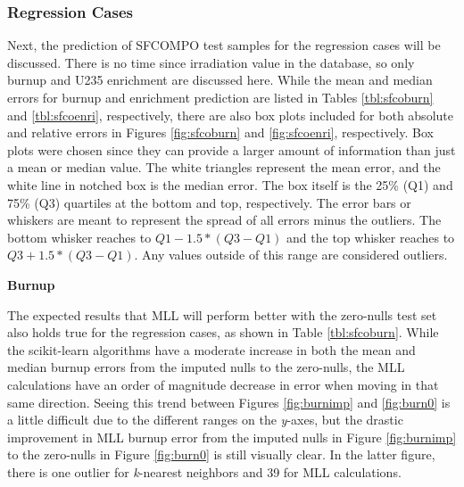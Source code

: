 \subsubsection{Regression Cases}
\label{sec:sfcoreg}

Next, the prediction of \gls{SFCOMPO} test samples for the regression cases
will be discussed. There is no time since irradiation value in the database, so
only burnup and \gls{U235} enrichment are discussed here.  While the mean and
median errors for burnup and enrichment prediction are listed in Tables
\ref{tbl:sfcoburn} and \ref{tbl:sfcoenri}, respectively, there are also box
plots included for both absolute and relative errors in Figures
\ref{fig:sfcoburn} and \ref{fig:sfcoenri}, respectively.  Box plots were chosen
since they can provide a larger amount of information than just a mean or
median value.  The white triangles represent the mean error, and the white line
in notched box is the median error. The box itself is the 25\% (Q1) and 75\%
(Q3) quartiles at the bottom and top, respectively. The error bars or whiskers
are meant to represent the spread of all errors minus the outliers.  The bottom
whisker reaches to $Q1 - 1.5*(Q3-Q1)$ and the top whisker reaches to $Q3 +
1.5*(Q3-Q1)$. Any values outside of this range are considered outliers.
\cite{matplotlib}

\noindent \textbf{Burnup}

The expected results that \gls{MLL} will perform better with the zero-nulls
test set also holds true for the regression cases, as shown in Table
\ref{tbl:sfcoburn}.  While the scikit-learn algorithms have a moderate increase
in both the mean and median burnup errors from the imputed nulls to the
zero-nulls, the \gls{MLL} calculations have an order of magnitude decrease in
error when moving in that same direction.  Seeing this trend between Figures
\ref{fig:burnimp} and \ref{fig:burn0} is a little difficult due to the
different ranges on the \textit{y}-axes, but the drastic improvement in
\gls{MLL} burnup error from the imputed nulls in Figure \ref{fig:burnimp} to
the zero-nulls in Figure \ref{fig:burn0} is still visually clear. In the latter
figure, there is one outlier for \textit{k}-nearest neighbors and 39 for
\gls{MLL} calculations.

